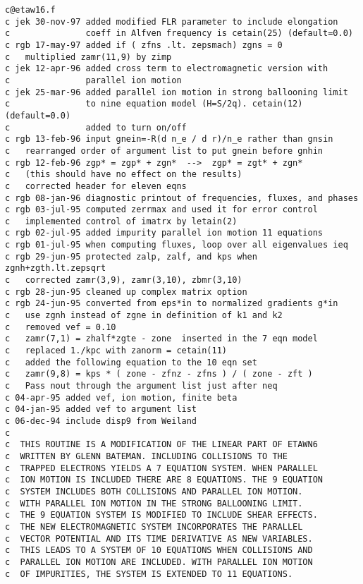 \begin{verbatim}
c@etaw16.f
c jek 30-nov-97 added modified FLR parameter to include elongation
c               coeff in Alfven frequency is cetain(25) (default=0.0)
c rgb 17-may-97 added if ( zfns .lt. zepsmach) zgns = 0
c   multiplied zamr(11,9) by zimp
c jek 12-apr-96 added cross term to electromagnetic version with
c               parallel ion motion
c jek 25-mar-96 added parallel ion motion in strong ballooning limit
c               to nine equation model (H=S/2q). cetain(12) (default=0.0)
c               added to turn on/off
c rgb 13-feb-96 input gnein=-R(d n_e / d r)/n_e rather than gnsin
c   rearranged order of argument list to put gnein before gnhin
c rgb 12-feb-96 zgp* = zgp* + zgn*  -->  zgp* = zgt* + zgn*
c   (this should have no effect on the results)
c   corrected header for eleven eqns
c rgb 08-jan-96 diagnostic printout of frequencies, fluxes, and phases
c rgb 03-jul-95 computed zerrmax and used it for error control
c   implemented control of imatrx by letain(2)
c rgb 02-jul-95 added impurity parallel ion motion 11 equations
c rgb 01-jul-95 when computing fluxes, loop over all eigenvalues ieq
c rgb 29-jun-95 protected zalp, zalf, and kps when zgnh+zgth.lt.zepsqrt
c   corrected zamr(3,9), zamr(3,10), zbmr(3,10)
c rgb 28-jun-95 cleaned up complex matrix option
c rgb 24-jun-95 converted from eps*in to normalized gradients g*in
c   use zgnh instead of zgne in definition of k1 and k2
c   removed vef = 0.10
c   zamr(7,1) = zhalf*zgte - zone  inserted in the 7 eqn model
c   replaced 1./kpc with zanorm = cetain(11)
c   added the following equation to the 10 eqn set
c   zamr(9,8) = kps * ( zone - zfnz - zfns ) / ( zone - zft )
c   Pass nout through the argument list just after neq
c 04-apr-95 added vef, ion motion, finite beta
c 04-jan-95 added vef to argument list
c 06-dec-94 include disp9 from Weiland
c
c  THIS ROUTINE IS A MODIFICATION OF THE LINEAR PART OF ETAWN6
c  WRITTEN BY GLENN BATEMAN. INCLUDING COLLISIONS TO THE
c  TRAPPED ELECTRONS YIELDS A 7 EQUATION SYSTEM. WHEN PARALLEL
c  ION MOTION IS INCLUDED THERE ARE 8 EQUATIONS. THE 9 EQUATION
c  SYSTEM INCLUDES BOTH COLLISIONS AND PARALLEL ION MOTION.
c  WITH PARALLEL ION MOTION IN THE STRONG BALLOONING LIMIT.
c  THE 9 EQUATION SYSTEM IS MODIFIED TO INCLUDE SHEAR EFFECTS.
c  THE NEW ELECTROMAGNETIC SYSTEM INCORPORATES THE PARALLEL
c  VECTOR POTENTIAL AND ITS TIME DERIVATIVE AS NEW VARIABLES.
c  THIS LEADS TO A SYSTEM OF 10 EQUATIONS WHEN COLLISIONS AND
c  PARALLEL ION MOTION ARE INCLUDED. WITH PARALLEL ION MOTION
c  OF IMPURITIES, THE SYSTEM IS EXTENDED TO 11 EQUATIONS.

\end{verbatim}

